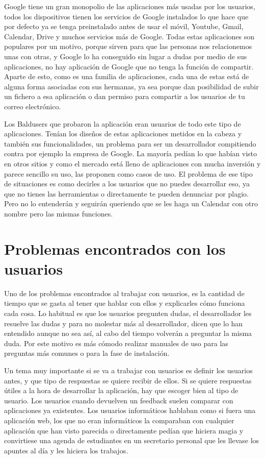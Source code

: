 Google tiene un gran monopolio de las aplicaciones más usadas por los usuarios, todos los dispositivos tienen los servicios de Google instalados lo que hace que por defecto ya se tenga preinstalado antes de usar el móvil, Youtube, Gmail, Calendar, Drive y muchos servicios más de Google.
Todas estas aplicaciones son populares por un motivo, porque sirven para que las personas nos relacionemos unas con otras, y Google lo ha conseguido sin lugar a dudas por medio de sus aplicaciones, no hay aplicación de Google que no tenga la función de compartir.
Aparte de esto, como es una familia de aplicaciones, cada una de estas está de alguna forma asociadas con sus hermanas, ya sea porque dan posibilidad de subir un fichero a esa aplicación o dan permiso para compartir a los usuarios de tu correo electrónico.

Los Baldusers que probaron la aplicación eran usuarios de todo este tipo de aplicaciones. Tenían los diseños de estas aplicaciones metidos en la cabeza y también sus funcionalidades, un problema para ser un desarrollador compitiendo contra por ejemplo la empresa de Google.
La mayoría pedían lo que habían visto en otros sitios y como el mercado está lleno de aplicaciones con mucha inversión y parece sencillo su uso, las proponen como casos de uso. 
El problema de ese tipo de situaciones es como decirles a los usuarios que no puedes desarrollar eso, ya que no tienes las herramientas o directamente te pueden denunciar por plagio.
Pero no lo entenderán y seguirán queriendo que se les haga un Calendar con otro nombre pero las mismas funciones.


\section{Problemas encontrados con los usuarios}
\label{secc:problemas encontrados con los usuarios}

Uno de los problemas encontrados al trabajar con usuarios, es la cantidad de tiempo que se gasta al tener que hablar con ellos y explicarles cómo funciona cada cosa.
Lo habitual es que los usuarios pregunten dudas, el desarrollador les resuelve las dudas y para no molestar más al desarrollador, dicen que lo han entendido aunque no sea así, al cabo del tiempo volverán a preguntar la misma duda. Por este motivo es más cómodo  realizar manuales de uso para las preguntas más comunes o para la fase de instalación.

Un tema muy importante si se va a trabajar con usuarios es definir los usuarios antes, y que tipo de respuestas se quiere recibir de ellos. Si se quiere respuestas útiles a la hora de desarrollar la aplicación, hay que escoger bien al tipo de usuario.
Los usuarios cuando devuelven un feedback suelen comparar con aplicaciones ya existentes.
Los usuarios informáticos hablaban como si fuera una aplicación web, los que no eran informáticos la comparaban con cualquier aplicación que han visto parecida o directamente pedían que hiciera magia y convirtiese  una agenda de estudiantes en un secretario personal que les llevase los apuntes al día y les hiciera los trabajos.

